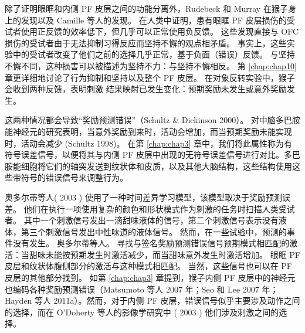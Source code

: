  除了证明眼眶和内侧 PF 皮层之间的功能分离外，Rudebeck 和 Murray 在猴子身上的发现以及 Camille 等人的发现。 在人类中证明，患有眼眶 PF 皮层损伤的受试者使用正反馈的效率低下，但几乎可以正常使用负反馈。 这些发现直接与 OFC 损伤的受试者由于无法抑制习得反应而坚持不懈的观点相矛盾。 事实上，这些实验中的受试者改变了他们之前的选择几乎正常，基于负面（错误）反馈。 与坚持不懈不同，这种损害可以被描述为坚持不力：与坚持不懈相反。 第 \ref{chap:chap10} 章更详细地讨论了行为抑制和坚持以及整个 PF 皮层。
在对象反转实验中，猴子会收到两种反馈，表明刺激-结果映射已发生变化：预期奖励未发生或意外奖励发生。\par 这两种情况都会导致“奖励预测错误”（Schultz \& Dickinson 2000）。 对中脑多巴胺能神经元的研究表明，当意外奖励到来时，活动会增加，而当预期奖励未能实现时，活动会减少 (Schultz 1998)。 在第 \ref{chap:chap3} 章中，我们将此属性称为有符号误差信号，以便将其与内侧 PF 皮层中出现的无符号误差信号进行对比。多巴胺能细胞将它们的轴突发送到纹状体和皮质，以及其他大脑结构，这些结构使用这些带符号的错误信号来调整行为。\par
奥多尔蒂等人( 2003 ) 使用了一种时间差异学习模型，该模型取决于奖励预测误差。 他们在执行一项使用复杂的颜色和形状模式作为刺激的任务时扫描人类受试者。 其中一个刺激信号发出一滴甜味液体的信号，第二个刺激信号表示没有液体，第三个刺激信号发出中性味道的液体信号。 然而，在一些试验中，预测的事件没有发生。 奥多尔蒂等人。 寻找与签名奖励预测错误信号预期模式相匹配的激活：当甜味未能按预期发生时激活减少，而当甜味意外发生时激活增加。 眼眶 PF 皮层和纹状体腹侧部分的激活与这种模式相匹配。
当然，这些信号也可以在 PF 皮层的其他部分找到。 如第 \ref{chap:chap3} 章提到，猴子内侧 PF 皮层中的神经元也编码各种奖励预测错误（Matsumoto 等人 2007 年；Seo 和 Lee 2007 年；Hayden 等人 2011a）。然而，对于内侧 PF 皮层，错误信号似乎主要涉及动作之间的选择，而在 O'Doherty 等人的影像学研究中 ( 2003 ) 他们涉及刺激之间的选择。\par
